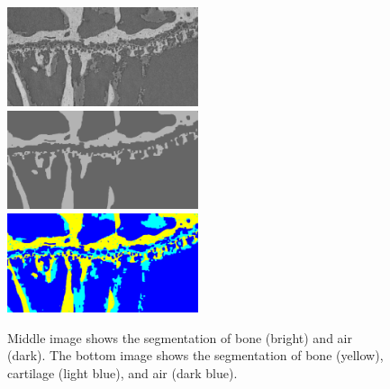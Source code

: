 \documentclass[a4paper]{article}
\begin{document}
	\begin{figure}[htbp]
	\centering
	\includegraphics[width=0.5\textwidth]{./figures/assign2_raw.png}
	\includegraphics[width=0.5\textwidth]{./figures/assign2_seg.png}
	\includegraphics[width=0.5\textwidth]{./figures/assign2_mseg.png}
    \caption{Middle image shows the segmentation of bone (bright) and air (dark). The bottom image shows the segmentation of bone (yellow), cartilage (light blue), and air (dark blue).}
\end{figure}
\end{document}
